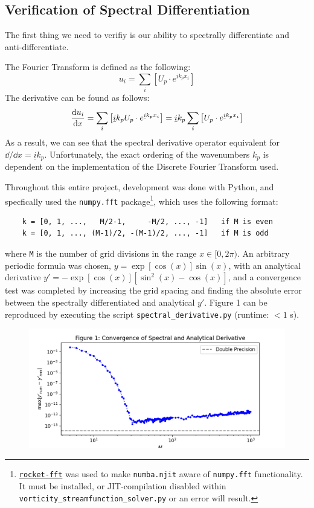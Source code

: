 \documentclass[12pt, reqno]{amsart}
\begin{document}
\subsection{Verification of Spectral Differentiation} 
The first thing we need to verifiy is our ability to spectrally differentiate and anti-differentiate. 

The Fourier Transform is defined as the following:
\begin{equation}
    u_i = \sum_i \left[ U_p \cdot e^{\underline{i} k_p x_i} \right]
\end{equation}
The derivative can be found as follows:
\begin{equation}
    \dv{u_i}{x} = \sum_i \left[ \underline{i} k_p U_p \cdot e^{\underline{i} k_p x_i} \right] = \underline{i} k_p \sum_i \left[ U_p \cdot e^{\underline{i} k_p x_i} \right]
\end{equation}
As a result, we can see that the spectral derivative operator equivalent for $\dd/\dd x = \underline{i} k_p$. Unfortunately, the exact ordering of the wavenumbers $k_p$ is dependent on the implementation of the Discrete Fourier Transform used. 

Throughout this entire project, development was done with Python, and specfically used the \texttt{numpy.fft} package\footnote{\href{https://pypi.org/project/rocket-fft/}{\texttt{rocket-fft}} was used to make \texttt{numba.njit} aware of \texttt{numpy.fft} functionality. It must be installed, or JIT-compilation disabled within \texttt{vorticity\_streamfunction\_solver.py} or an error will result.}, which uses the following format:
\begin{verbatim}
    k = [0, 1, ...,   M/2-1,     -M/2, ..., -1]   if M is even
    k = [0, 1, ..., (M-1)/2, -(M-1)/2, ..., -1]   if M is odd
\end{verbatim}

where \texttt{M} is the number of grid divisions in the range $x \in [0, 2\pi)$.
An arbitrary periodic formula was chosen, $y = \exp [ \cos(x) ] \sin(x)$, with an analytical derivative $y' = - \exp [ \cos(x) ] \left[ \sin^2(x) - \cos(x) \right]$, and a convergence test was completed by increasing the grid spacing and finding the absolute error between the spectrally differentiated and analytical $y'$.
Figure 1 can be reproduced by executing the script \texttt{spectral\_derivative.py} (runtime: $<1$ s).

\begin{figure}[H]
    \centering
    \includegraphics[width = 1\linewidth]{spectral_derivative.png}
\end{figure}
\end{document}
